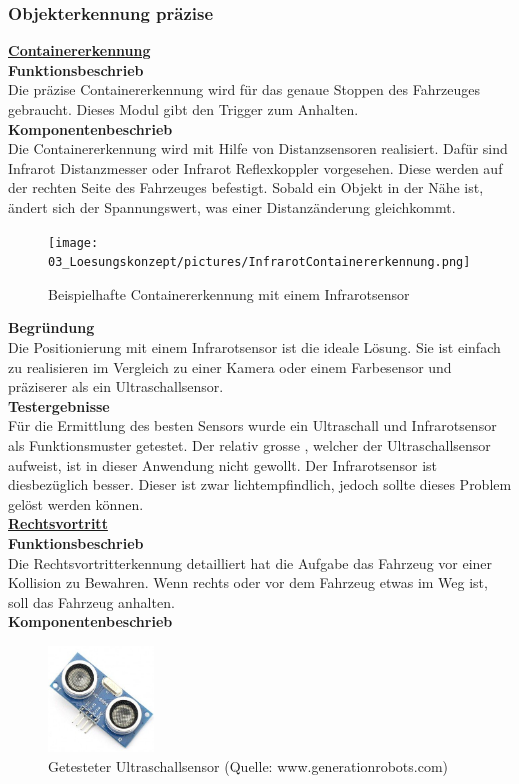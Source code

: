 \subsubsection{Objekterkennung präzise}
\underline{\textbf{Containererkennung}}\\[0.2cm]
\textbf{Funktionsbeschrieb}\\[0.2cm]
Die präzise Containererkennung wird für das genaue Stoppen des Fahrzeuges gebraucht. Dieses Modul gibt den Trigger zum Anhalten.\\[0.2cm]
\textbf{Komponentenbeschrieb}\\[0.2cm]
Die Containererkennung wird mit Hilfe von Distanzsensoren realisiert. Dafür sind Infrarot Distanzmesser oder Infrarot Reflexkoppler vorgesehen. Diese werden auf der rechten Seite des Fahrzeuges befestigt. Sobald ein Objekt in der Nähe ist, ändert sich der Spannungswert, was einer Distanzänderung gleichkommt. 
\begin{figure} [H]
	\centering
	\texttt{[image: 03\_Loesungskonzept/pictures/InfrarotContainererkennung.png]}
	\caption{Beispielhafte Containererkennung mit einem Infrarotsensor}
\end{figure}
\flushleft
\textbf{Begründung}\\[0.2cm]
Die Positionierung mit einem Infrarotsensor ist die ideale Lösung. Sie ist einfach zu realisieren im Vergleich zu einer Kamera oder einem Farbesensor und präziserer als ein Ultraschallsensor.\\[0.2cm]
\textbf{Testergebnisse}\\[0.2cm]
Für die Ermittlung des besten Sensors wurde ein Ultraschall und Infrarotsensor als Funktionsmuster getestet. Der relativ grosse \grqq, welcher der Ultraschallsensor aufweist, ist in dieser Anwendung nicht gewollt. Der Infrarotsensor ist diesbezüglich besser. Dieser ist zwar lichtempfindlich, jedoch sollte dieses Problem gelöst werden können.\\[0.2cm]
%
\underline{\textbf{Rechtsvortritt}} \\[0.2cm]
\textbf{Funktionsbeschrieb}\\[0.2cm]
Die Rechtsvortritterkennung detailliert hat die Aufgabe das Fahrzeug vor einer Kollision zu Bewahren. Wenn rechts oder vor dem Fahrzeug etwas im Weg ist, soll das Fahrzeug anhalten.\\[0.2cm]
\textbf{Komponentenbeschrieb}\\[0.2cm]
\begin{figure} [H]
	\centering
	\includegraphics[width=0.25\textwidth]{03_Loesungskonzept/pictures/ultraschallsensor.png}
	\caption{Getesteter Ultraschallsensor (Quelle: www.generationrobots.com)}
\end{figure}
